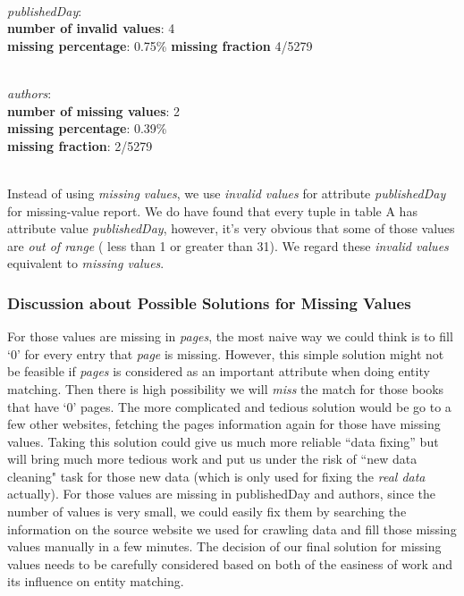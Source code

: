 \documentclass[10pt, oneside]{article}
\begin{document}
\vspace{1ex}
\noindent
\\
\textit{publishedDay}: \\
\textbf{number of invalid values}: 4 \\ 
\textbf{missing percentage}: 0.75\% 
\textbf{missing fraction} 4/5279

\vspace{1ex}
\noindent
\\
\textit{authors}: \\
\textbf{number of missing values}: 2 \\ 
\textbf{missing percentage}: 0.39\% \\
\textbf{missing fraction}: 2/5279

\vspace{1ex}
\noindent
\\
Instead of using \textit{missing values}, we use \textit{invalid values} for attribute \textit{publishedDay} for missing-value report. We do have found that every tuple in table A has attribute value 
\textit{publishedDay}, however, it's very obvious that some of those values are \textit{out of range} ( less than 1 or greater than 31). We regard these \textit{invalid values}
equivalent to \textit{missing values}.    

\subsubsection*{Discussion about Possible Solutions for Missing Values}
For those values are missing in \textit{pages}, the most naive way we could think is to fill `0' for every entry that \textit{page} is missing. However, this simple solution might not 
be feasible if \textit{pages} is considered as an important attribute when doing entity matching. Then there is high possibility we will \textit{miss} the match for those books that 
have `0' pages. The more complicated and tedious solution would be go to a few other websites, fetching the pages information again for those have missing values. Taking this
solution could give us much more reliable ``data fixing'' but will bring much more tedious work and put us under the risk of ``new data cleaning" task for those new data (which
is only used for fixing the \textit{real data} actually). For those values are missing in publishedDay and authors, since the number of values is very small, we could easily fix them
by searching the information on the source website we used for crawling data and fill those missing values manually in a few minutes. The decision of our final solution for missing 
values needs to be carefully considered based on both of the easiness of work and its influence on entity matching.  
\end{document}
